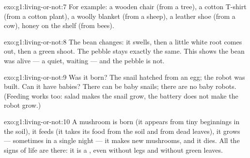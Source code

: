 \begin{solution}{exo:g1:living-or-not:7}
For example: a wooden chair (from a tree), a cotton T-shirt (from a
cotton plant), a woolly blanket (from a sheep), a leather shoe
(from a cow), honey on the shelf (from bees).
\end{solution}

\begin{solution}{exo:g1:living-or-not:8}
The bean changes: it swells, then a little white root comes out,
then a green shoot. The pebble stays exactly the same. This shows
the bean was alive --- a quiet, waiting  --- and the
pebble is not.
\end{solution}

\begin{solution}{exo:g1:living-or-not:9}
Was it born? The snail hatched from an egg; the robot was built.
Can it have babies? There can be baby snails; there are no baby
robots. (Feeding works too: salad makes the snail grow, the battery
does not make the robot grow.)
\end{solution}

\begin{solution}{exo:g1:living-or-not:10}
A mushroom is born (it appears from tiny beginnings in the soil),
it feeds (it takes its food from the soil and from dead leaves), it
grows --- sometimes in a single night --- it makes new mushrooms,
and it dies. All the signs of life are there: it is a ,
even without legs and without green leaves.
\end{solution}
